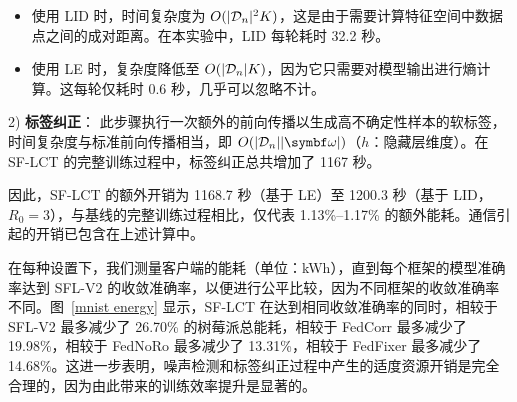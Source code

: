 \begin{itemize}
    \item 使用 LID 时，时间复杂度为 $O(|\mathcal{D}_n|^2 K)$，这是由于需要计算特征空间中数据点之间的成对距离。在本实验中，LID 每轮耗时 32.2 秒。
    \item 使用 LE 时，复杂度降低至 $O(|\mathcal{D}_n| K)$，因为它只需要对模型输出进行熵计算。这每轮仅耗时 0.6 秒，几乎可以忽略不计。
\end{itemize}
2) \textbf{标签纠正}：
此步骤执行一次额外的前向传播以生成高不确定性样本的软标签，时间复杂度与标准前向传播相当，即 $O(|\D_n| |\omegab|)$（$h$：隐藏层维度）。在 SF-LCT 的完整训练过程中，标签纠正总共增加了 1167 秒。

因此，SF-LCT 的额外开销为 1168.7 秒（基于 LE）至 1200.3 秒（基于 LID，$R_0=3$），与基线的完整训练过程相比，仅代表 1.13\%–1.17\% 的额外能耗。通信引起的开销已包含在上述计算中。

在每种设置下，我们测量客户端的能耗（单位：kWh），直到每个框架的模型准确率达到 SFL-V2 的收敛准确率，以便进行公平比较，因为不同框架的收敛准确率不同。图~\ref{mnist energy} 显示，SF-LCT 在达到相同收敛准确率的同时，相较于 SFL-V2 最多减少了 26.70\% 的树莓派总能耗，相较于 FedCorr 最多减少了 19.98\%，相较于 FedNoRo 最多减少了 13.31\%，相较于 FedFixer 最多减少了 14.68\%。这进一步表明，噪声检测和标签纠正过程中产生的适度资源开销是完全合理的，因为由此带来的训练效率提升是显著的。